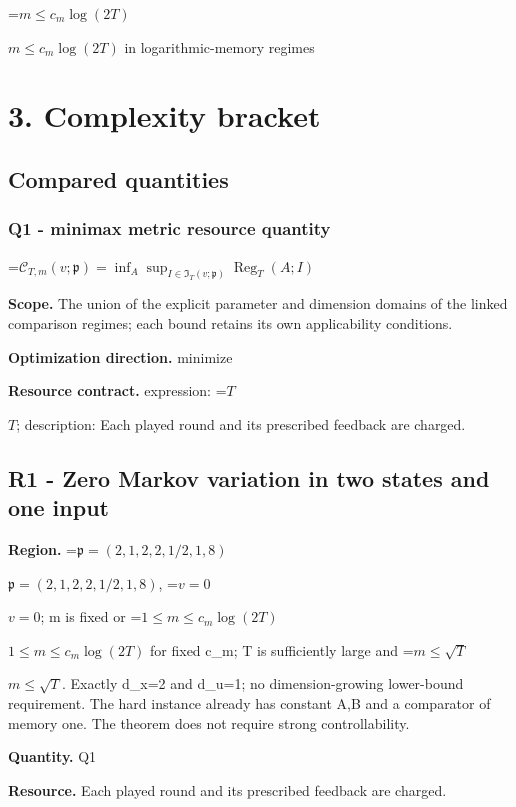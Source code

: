 \documentclass[10pt,a4paper]{article}
\newcommand{\AtlasMath}[1]{\par\begingroup\centering\setbox0=\hbox{$\displaystyle #1$}\ifdim\wd0>1.4\linewidth\typeout{ATLAS WIDE FORMULA: \the\wd0}\fi\ifdim\wd0>\linewidth\resizebox{\linewidth}{!}{\box0}\else\box0\fi\par\endgroup}
\newcommand{\AtlasInlineMath}[1]{\begingroup\setbox0=\hbox{$#1$}\ifdim\wd0>.4\linewidth\endgroup\AtlasMath{#1}\else\endgroup$#1$\fi}
\begin{document}
\AtlasInlineMath{m\le c_m\log(2T)} in logarithmic-memory regimes



\section{3. Complexity bracket}


\subsection{Compared quantities}


\subsubsection{Q1 - minimax metric resource quantity}


\AtlasMath{\mathcal C_{T,m}(v;\mathfrak p)=\inf_A\sup_{I\in\mathfrak I_T(v;\mathfrak p)}\operatorname{Reg}_T(A;I)}


\textbf{Scope.} The union of the explicit parameter and dimension domains of the linked comparison regimes; each bound retains its own applicability conditions.



\textbf{Optimization direction.} minimize



\textbf{Resource contract.} expression: \AtlasInlineMath{T}; description: Each played round and its prescribed feedback are charged.



\subsection{R1 - Zero Markov variation in two states and one input}


\textbf{Region.} \AtlasInlineMath{\mathfrak p=(2,1,2,2,1/2,1,8)}, \AtlasInlineMath{v=0}; m is fixed or \AtlasInlineMath{1\le m\le c_m\log(2T)} for fixed c\_m; T is sufficiently large and \AtlasInlineMath{m\le\sqrt T}. Exactly d\_x=2 and d\_u=1; no dimension-growing lower-bound requirement. The hard instance already has constant A,B and a comparator of memory one. The theorem does not require strong controllability.



\textbf{Quantity.} Q1



\textbf{Resource.} Each played round and its prescribed feedback are charged.
\end{document}
